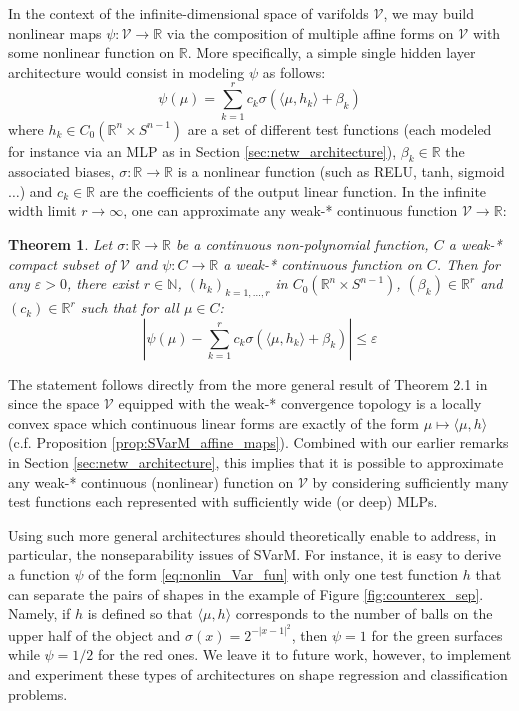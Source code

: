 \documentclass[11pt]{article}
\newtheorem{thm}{Theorem}
\newcommand{\R}{\mathbb{R}}
\begin{document}
In the context of the infinite-dimensional space of varifolds $\mathcal{V}$, we may build nonlinear maps $\psi: \mathcal{V} \rightarrow \R$ via the composition of multiple affine forms on $\mathcal{V}$ with some nonlinear function on $\R$. More specifically, a simple single hidden layer architecture would consist in modeling $\psi$ as follows:
\begin{equation}
\label{eq:nonlin_Var_fun}
 \psi(\mu) = \sum_{k=1}^{r} c_k \sigma(\langle \mu, h_k \rangle + \beta_k)
\end{equation}
where $h_k \in C_0(\R^n \times S^{n-1})$ are a set of different test functions (each modeled for instance via an MLP as in Section \ref{sec:netw_architecture}), $\beta_k \in \R$ the associated biases, $\sigma:\R \rightarrow \R$ is a nonlinear function (such as RELU, tanh, sigmoid$\ldots$) and $c_k \in \R$ are the coefficients of the output linear function. In the infinite width limit $r \rightarrow \infty$, one can approximate any weak-* continuous function $\mathcal{V} \rightarrow \R$:
\begin{thm}
Let $\sigma: \R \rightarrow \R$ be a continuous non-polynomial function, $C$ a weak-* compact subset of $\mathcal{V}$ and $\psi:C \rightarrow \R$ a weak-* continuous function on $C$. Then for any $\varepsilon >0$, there exist $r \in \mathbb{N}$, $(h_k)_{k=1,\ldots,r}$ in $C_0(\R^n \times S^{n-1})$, $(\beta_k) \in \R^r$ and $(c_k) \in \R^{r}$ such that for all $\mu \in C$: 
\begin{equation*}
\left|\psi(\mu) - \sum_{k=1}^{r} c_k \sigma(\langle \mu, h_k \rangle + \beta_k) \right| \leq \varepsilon
\end{equation*}
\end{thm}
The statement follows directly from the more general result of Theorem 2.1 in \cite{ismailov2024UAT} since the space $\mathcal{V}$ equipped with the weak-* convergence topology is a locally convex space which continuous linear forms are exactly of the form $\mu \mapsto \langle \mu , h \rangle$ (c.f. Proposition \ref{prop:SVarM_affine_maps}). Combined with our earlier remarks in Section \ref{sec:netw_architecture}, this implies that it is possible to approximate any weak-* continuous (nonlinear) function on $\mathcal{V}$ by considering sufficiently many test functions each represented with sufficiently wide (or deep) MLPs.  

Using such more general architectures should theoretically enable to address, in particular, the nonseparability issues of SVarM. For instance, it is easy to derive a function $\psi$ of the form \eqref{eq:nonlin_Var_fun} with only one test function $h$ that can separate the pairs of shapes in the example of Figure \ref{fig:counterex_sep}. Namely, if $h$ is defined so that $\langle \mu,h \rangle$ corresponds to the number of balls on the upper half of the object and $\sigma(x)= 2^{-|x-1|^2}$, then $\psi=1$ for the green surfaces while $\psi=1/2$ for the red ones. We leave it to future work, however, to implement and experiment these types of architectures on shape regression and classification problems. 
\end{document}
